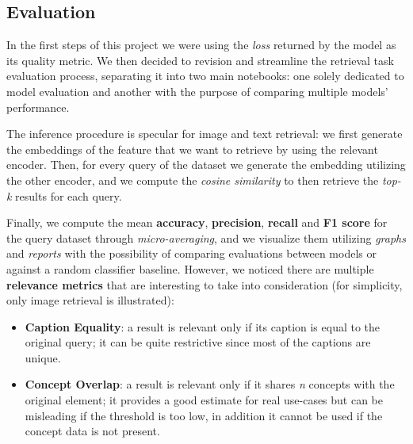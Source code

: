 \documentclass[10pt,twocolumn,letterpaper]{article}
\begin{document}
\subsection{Evaluation}
In the first steps of this project we were using the \textit{loss} returned by the model as its quality metric.
We then decided to revision and streamline the retrieval task evaluation process, separating it into two main notebooks: one solely dedicated to model evaluation and another with the purpose of comparing multiple models' performance.

The inference procedure is specular for image and text retrieval: we first generate the embeddings of the feature that we want to retrieve by using the relevant encoder.
Then, for every query of the dataset we generate the embedding utilizing the other encoder, and we compute the \textit{cosine similarity} to then retrieve the \textit{top-k} results for each query.

Finally, we compute the mean \textbf{accuracy}, \textbf{precision}, \textbf{recall} and \textbf{F1 score} for the query dataset through \textit{micro-averaging}, and we visualize them utilizing \textit{graphs} and \textit{reports} with the possibility of comparing evaluations between models or against a random classifier baseline.
However, we noticed there are multiple \textbf{relevance metrics} that are interesting to take into consideration (for simplicity, only image retrieval is illustrated):
\begin{itemize}
   \item \textbf{Caption Equality}: a result is relevant only if its caption is equal to the original query; it can be quite restrictive since most of the captions are unique.
   \item \textbf{Concept Overlap}: a result is relevant only if it shares \textit{n} concepts with the original element; it provides a good estimate for real use-cases but can be misleading if the threshold is too low, in addition it cannot be used if the concept data is not present.
\end{itemize}
\end{document}
